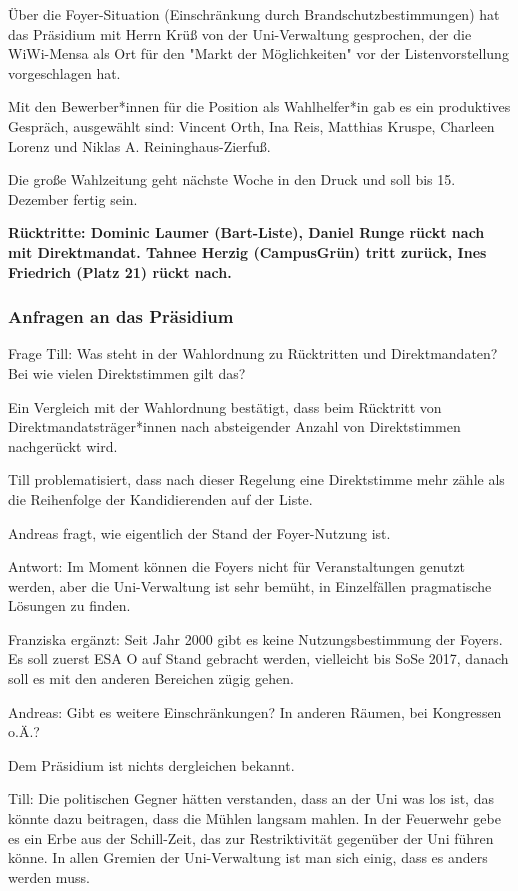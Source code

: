 \documentclass[ngerman,headheight=70pt]{scrartcl}
\begin{document}
    Über die Foyer-Situation (Einschränkung durch Brandschutzbestimmungen) hat
    das Präsidium mit Herrn Krüß von der Uni-Verwaltung gesprochen, der die
    WiWi-Mensa als Ort für den "Markt der Möglichkeiten" vor der
    Listenvorstellung vorgeschlagen hat.

    Mit den Bewerber*innen für die Position als Wahlhelfer*in gab es ein
    produktives Gespräch, ausgewählt sind: Vincent Orth, Ina Reis, Matthias
    Kruspe, Charleen Lorenz und Niklas A. Reininghaus-Zierfuß.

    Die große Wahlzeitung geht nächste Woche in den Druck und soll bis 15.
    Dezember fertig sein.

    \textbf{Rücktritte: Dominic Laumer (Bart-Liste), Daniel Runge rückt nach mit
    Direktmandat. Tahnee Herzig (CampusGrün) tritt zurück, Ines Friedrich (Platz
    21) rückt nach.}

    \subsubsection{Anfragen an das Präsidium}

    Frage Till: Was steht in der Wahlordnung zu Rücktritten und Direktmandaten?
    Bei wie vielen Direktstimmen gilt das?

    Ein Vergleich mit der Wahlordnung bestätigt, dass beim Rücktritt von
    Direktmandatsträger*innen nach absteigender Anzahl von Direktstimmen
    nachgerückt wird.

    Till problematisiert, dass nach dieser Regelung eine Direktstimme mehr zähle
    als die Reihenfolge der Kandidierenden auf der Liste.

    Andreas fragt, wie eigentlich der Stand der Foyer-Nutzung ist.

    Antwort: Im Moment können die Foyers nicht für Veranstaltungen genutzt werden,
    aber die Uni-Verwaltung ist sehr bemüht, in Einzelfällen pragmatische
    Lösungen zu finden.

    Franziska ergänzt: Seit Jahr 2000 gibt es keine Nutzungsbestimmung der
    Foyers. Es soll zuerst ESA O auf Stand gebracht werden, vielleicht bis SoSe
    2017, danach soll es mit den anderen Bereichen zügig gehen.

    Andreas: Gibt es weitere Einschränkungen? In anderen Räumen, bei Kongressen
    o.Ä.?

    Dem Präsidium ist nichts dergleichen bekannt.

    Till: Die politischen Gegner hätten verstanden, dass an der Uni was los ist,
    das könnte dazu beitragen, dass die Mühlen langsam mahlen. In der Feuerwehr
    gebe es ein Erbe aus der Schill-Zeit, das zur Restriktivität gegenüber der
    Uni führen könne. In allen Gremien der Uni-Verwaltung ist man sich einig,
    dass es anders werden muss.
\end{document}

